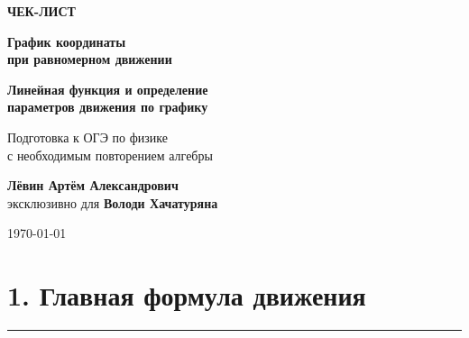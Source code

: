 \documentclass[a4paper,12pt]{article}
\newcommand{\sectionline}{%
  \par\noindent\color{accent}\rule{\linewidth}{0.5pt}\color{textgray}\par
}
\begin{document}

\begin{titlepage}
\thispagestyle{empty}

\begin{center}

\vspace*{2.2cm}

{\Large\color{softgray}\textbf{ЧЕК-ЛИСТ}}

\vspace{0.7cm}

{\Huge\bfseries\color{darkaccent}
График координаты\\[0.25cm]
при равномерном движении
}

\vspace{0.45cm}

{\LARGE\bfseries
Линейная функция и определение\\
параметров движения по графику
}

\vspace{1.2cm}

{\large
Подготовка к ОГЭ по физике\\
с необходимым повторением алгебры
}

\vfill

{\large
\textbf{Лёвин Артём Александрович}\\[0.2cm]
эксклюзивно для \textbf{Володи Хачатуряна}
}

\vspace{0.8cm}

{\large \today}

\vfill


\vspace{0.4cm}

\end{center}
\end{titlepage}


\section{\color{darkaccent}1. Главная формула движения}
\sectionline
\end{document}
